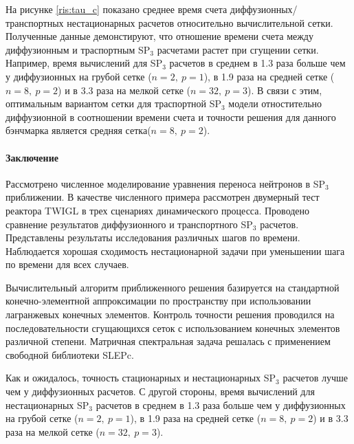 \documentclass{crm-article}
\begin{document}
На рисунке \ref{ris:tau_c} показано среднее время счета диффузионных/транспортных нестационарных расчетов относительно вычислительной сетки.
Полученные данные демонстируют, что отношение времени счета между диффузионным и траспортным SP$_3$ расчетами растет при сгущении сетки.
Например, время вычислений для SP$_3$ расчетов в среднем в 1.3 раза больше чем у диффузионных на грубой сетке ($n=2,\ p=1$), в 1.9 раза на средней сетке ($n=8,\ p=2$) и в 3.3 раза на мелкой сетке ($n=32,\ p=3$). 
В связи с этим, оптимальным вариантом сетки для траспортной SP$_3$ модели отностительно диффузионной в соотношении времени счета и точности решения для данного бэнчмарка является средняя сетка($n=8,\ p=2$).
	
\paragraph{Заключение}

Рассмотрено численное моделирование уравнения переноса нейтронов в SP$_3$ приближении.
В качестве численного примера рассмотрен двумерный тест реактора TWIGL в трех сценариях динамического процесса.
Проводено сравнение результатов диффузионного и транспортного SP$_3$ расчетов. 
Представлены результаты исследования различных шагов по времени.
Наблюдается хорошая сходимость нестационарной задачи при уменьшении шага по времени для всех случаев.

Вычислительный алгоритм приближенного решения базируется на стандартной конечно-элементной аппроксимации по пространству при использовании лагранжевых конечных элементов.
Контроль точности решения проводился на последовательности сгущающихся сеток с использованием конечных элементов различной степени.
Матричная спектральная задача решалась с применением свободной библиотеки SLEPc.

Как и ожидалось, точность стационарных и нестационарных SP$_3$ расчетов лучше чем у диффузионных расчетов. 
С другой стороны, время вычислений для нестационарных SP$_3$ расчетов в среднем в 1.3 раза больше чем у диффузионных на грубой сетке ($n=2,\ p=1$), в 1.9 раза на средней сетке ($n=8,\ p=2$) и в 3.3 раза на мелкой сетке ($n=32,\ p=3$).
\end{document}
